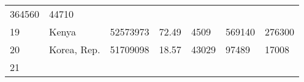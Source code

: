 \documentclass[
]{article}
\begin{document}
\begin{longtable}[]{@{}lllllll@{}}
\begin{minipage}[t]{0.12\columnwidth}
364560\strut
\end{minipage} & \begin{minipage}[t]{0.12\columnwidth}\raggedright
44710\strut
\end{minipage}\tabularnewline
\begin{minipage}[t]{0.06\columnwidth}\raggedright
19\strut
\end{minipage} & \begin{minipage}[t]{0.15\columnwidth}\raggedright
Kenya\strut
\end{minipage} & \begin{minipage}[t]{0.13\columnwidth}\raggedright
52573973\strut
\end{minipage} & \begin{minipage}[t]{0.13\columnwidth}\raggedright
72.49\strut
\end{minipage} & \begin{minipage}[t]{0.09\columnwidth}\raggedright
4509\strut
\end{minipage} & \begin{minipage}[t]{0.12\columnwidth}\raggedright
569140\strut
\end{minipage} & \begin{minipage}[t]{0.12\columnwidth}\raggedright
276300\strut
\end{minipage}\tabularnewline
\begin{minipage}[t]{0.06\columnwidth}\raggedright
20\strut
\end{minipage} & \begin{minipage}[t]{0.15\columnwidth}\raggedright
Korea, Rep.\strut
\end{minipage} & \begin{minipage}[t]{0.13\columnwidth}\raggedright
51709098\strut
\end{minipage} & \begin{minipage}[t]{0.13\columnwidth}\raggedright
18.57\strut
\end{minipage} & \begin{minipage}[t]{0.09\columnwidth}\raggedright
43029\strut
\end{minipage} & \begin{minipage}[t]{0.12\columnwidth}\raggedright
97489\strut
\end{minipage} & \begin{minipage}[t]{0.12\columnwidth}\raggedright
17008\strut
\end{minipage}\tabularnewline
\begin{minipage}[t]{0.06\columnwidth}\raggedright
21\strut

\end{minipage}
\end{longtable}
\end{document}
